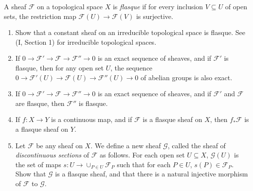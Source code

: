 \begin{exercise} %
	A sheaf $\mathscr{F} $ on a topological space $X $ is \textit{flasque} if for every inclusion $V\subseteq U $ of open sets, the restriction map $\mathscr{F}(U) \to \mathscr{F}(V) $ is surjective.
	\begin{enumerate}
		\item Show that a constant sheaf on an irreducible topological space is flasque. See (I, Section 1) for irreducible topological spaces.
		\item If $0 \to \mathscr{F}' \to \mathscr{F} \to \mathscr{F}'' \to 0 $ is an exact sequence of sheaves, and if $\mathscr{F}' $ is flasque, then for any open set $U $, the sequence $0 \to \mathscr{F}'(U) \to \mathscr{F}(U) \to \mathscr{F}''(U) \to 0 $ of abelian groups is also exact.
		\item If $0 \to \mathscr{F}' \to \mathscr{F} \to \mathscr{F}'' \to 0 $ is an exact sequence of sheaves, and if $\mathscr{F}' $ and $\mathscr{F} $ are flasque, then $\mathscr{F}'' $ is flasque.
		\item If $f: X\to Y $ is a continuous map, and if $\mathscr{F} $ is a flasque sheaf on $X $, then $f_\ast \mathscr{F} $ is a flasque sheaf on $Y $.
		\item Let $\mathscr{F} $ be any sheaf on $X $. We define a new sheaf $\mathscr{G} $, called the sheaf of \textit{discontinuous sections} of $\mathscr{F} $ as follows. For each open set $U \subseteq X $, $\mathscr{G}(U) $ is the set of maps $s: U \to \cup_{P \in U} \mathscr{F}_P $ such that for each $P \in U $, $s(P) \in \mathscr{F}_P $. Show that $\mathscr{G} $ is a flasque sheaf, and that there is a natural injective morphism of $\mathscr{F} $ to $\mathscr{G} $.
	\end{enumerate}
\end{exercise}
